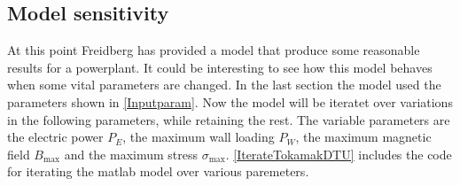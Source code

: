 \subsection{Model sensitivity}
At this point Freidberg has provided a model that produce some reasonable results for a powerplant. It could be interesting to see how this model behaves when some vital parameters are changed. In the last section the model used the parameters shown in \cref{Inputparam}. Now the model will be iteratet over variations in the following parameters, while retaining the rest.
The variable parameters are the electric power \(P_E\), the maximum wall loading \(P_W\), the maximum magnetic field \(B_{\max}\) and the maximum stress \(\sigma_{\max}\).
\cref{IterateTokamakDTU} includes the code for iterating the matlab model over various paremeters.

